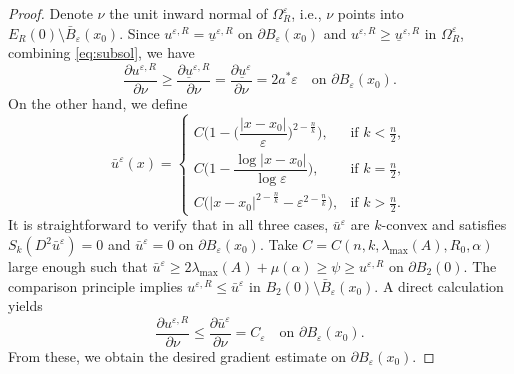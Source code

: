 \documentclass[reqno]{amsart}
\theoremstyle{remark}
\theoremstyle{definition}
\numberwithin{equation}{section}
\begin{document}
\begin{proof}
	Denote $\nu$ the unit inward normal of $\Omega_R^\varepsilon$, i.e., $\nu$ points into $E_R(0)\setminus\bar{B}_\varepsilon(x_0)$. Since $u^{\varepsilon,R} = \underline{u}^{\varepsilon,R}$ on $\partial B_\varepsilon(x_0)$ and $u^{\varepsilon,R} \geq \underline{u}^{\varepsilon,R}$ in $\Omega_R^\varepsilon$,
	combining \eqref{eq:subsol}, we have
    \[
        \frac{\partial u^{\varepsilon,R}}{\partial \nu} \geq \frac{\partial \underline{u}^{\varepsilon,R}}{\partial \nu}=\frac{\partial \underline{u}^{\varepsilon}}{\partial \nu}=2a^*\varepsilon \quad \text{on } \partial B_\varepsilon(x_0).
    \]
	On the other hand, we define
    \begin{equation*}
        \bar{u}^\varepsilon(x) = 
        \begin{cases}
            C \bigg( 1 - \bigg( \dfrac{|x-x_0|}{\varepsilon} \bigg)^{2 - \frac{n}{k}} \bigg), & \text{if } k < \frac{n}{2}, \\[10pt]
            C \bigg( 1-\dfrac{\log |x-x_0|}{\log \varepsilon} \bigg), & \text{if } k = \frac{n}{2}, \\[10pt]
            C \bigg(|x-x_0|^{2-\frac{n}{k}}-\varepsilon^{2-\frac{n}{k}}\bigg), & \text{if } k > \frac{n}{2}.
        \end{cases}
    \end{equation*}
    It is straightforward to verify that in all three cases, $\bar{u}^\varepsilon$ are $k$-convex and satisfies $S_k(D^2 \bar{u}^\varepsilon) = 0$ and $\bar{u}^\varepsilon=0$ on $\partial B_\varepsilon(x_0)$. Take $C=C(n,k,\lambda_{\text{max}}(A),R_0,\alpha)$ large enough such that $\bar{u}^\varepsilon\geq2\lambda_{\text{max}}(A)+\mu(\alpha)\geq\psi\geq u^{\varepsilon,R}$ on $\partial B_2(0)$. The comparison principle implies $u^{\varepsilon,R}\leq\bar{u}^\varepsilon$ in $B_2(0)\setminus\bar{B}_\varepsilon(x_0)$. A direct calculation yields
	$$\frac{\partial u^{\varepsilon,R}}{\partial \nu}\leq\frac{\partial\bar{u}^\varepsilon}{\partial\nu} = C_\varepsilon \quad\text{on }\partial B_\varepsilon(x_0).$$
    From these, we obtain the desired gradient estimate on $\partial B_\varepsilon(x_0)$.


\end{proof}
\end{document}
